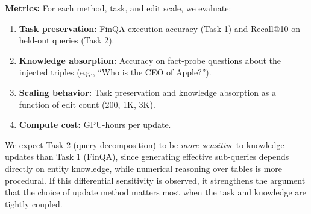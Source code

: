 \documentclass{article}
\begin{document}
\bigskip

\textbf{Metrics:}
For each method, task, and edit scale, we evaluate:
\begin{enumerate}
    \item \textbf{Task preservation:} FinQA execution accuracy (Task 1) and Recall@10 on held-out queries (Task 2).
    \item \textbf{Knowledge absorption:} Accuracy on fact-probe questions about the injected triples (e.g., ``Who is the CEO of Apple?'').
    \item \textbf{Scaling behavior:} Task preservation and knowledge absorption as a function of edit count (200, 1K, 3K).
    \item \textbf{Compute cost:} GPU-hours per update.
\end{enumerate}

We expect Task 2 (query decomposition) to be \emph{more sensitive} to knowledge updates than Task 1 (FinQA), since generating effective sub-queries depends directly on entity knowledge, while numerical reasoning over tables is more procedural. If this differential sensitivity is observed, it strengthens the argument that the choice of update method matters most when the task and knowledge are tightly coupled.

\bigskip
\end{document}
